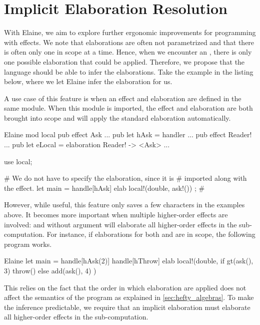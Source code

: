 \chapter{Implicit Elaboration Resolution}\label{chap:elabres}

With Elaine, we aim to explore further ergonomic improvements for programming with effects. We note that elaborations are often not parametrized and that there is often only one in scope at a time. Hence, when we encounter an , there is only one possible elaboration that could be applied. Therefore, we propose that the language should be able to infer the elaborations. Take the example in the listing below, where we let Elaine infer the elaboration for us.


A use case of this feature is when an effect and elaboration are defined in the same module. When this module is imported, the effect and elaboration are both brought into scope and  will apply the standard elaboration automatically.

\begin{lst}{Elaine}
mod local {
    pub effect Ask { ... }
    pub let hAsk = handler { ... }
    pub effect Reader! { ... }
    pub let eLocal = elaboration Reader! -> <Ask> { ... }
}

use local;

# We do not have to specify the elaboration, since it is
# imported along with the effect.
let main = handle[hAsk] elab { local!(double, ask!()) };
#                          ^^^
\end{lst}
%
However, while useful, this feature only saves a few characters in the examples above. It becomes more important when multiple higher-order effects are involved: and  without argument will elaborate all higher-order effects in the sub-computation. For instance, if elaborations for both  and  are in scope, the following program works.

\begin{lst}{Elaine}
let main = handle[hAsk(2)] handle[hThrow] elab {
    local!(double, {
        if gt(ask(), 3) {
            throw() 
        } else {
            add(ask(), 4)
        }
    })
}
\end{lst}
%
This relies on the fact that the order in which elaboration are applied does not affect the semantics of the program as explained in \cref{sec:hefty_algebras}. To make the inference predictable, we require that an implicit elaboration must elaborate all higher-order effects in the sub-computation.

